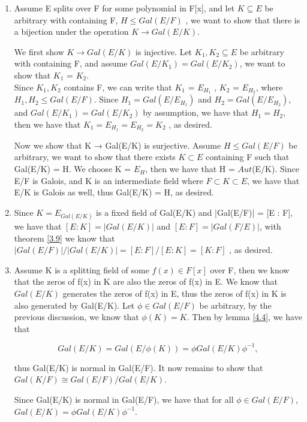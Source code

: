 \documentclass[a4paper, 10pt]{article}
\theoremstyle{plain}
\theoremstyle{definition}
\theoremstyle{remark}
\begin{document}
    \begin{enumerate}
    
  \item Assume E splits over F for some polynomial in F[x], and let $K \subseteq E$ be arbitrary with containing F,  $H \leq Gal(E/F)$ , we want to show that there is a bijection under the operation  $K \longrightarrow Gal(E/K)$.

We first show $K \longrightarrow Gal(E/K)$ is injective. Let $K_1, K_2 \subseteq E$ be arbitrary with containing F, and
assume $Gal(E/K_1) = Gal(E/K_2)$, we want to show that $K_1$ = $K_2$. \\
Since $K_1, K_2$ contains F, we can write that $K_1$ = $E_{H_1}$
, $K_2$ = $E_{H_2}$,   where $H_1, H_2 \leq Gal(E/F)$. 
Since $H_1 = Gal(E/E_{H_1})$ and $H_2 = Gal(E/E_{H_2})$, and $Gal(E/K_1) = Gal(E/K_2)$ by assumption, we have that $H_1 = H_2$, then we
have that $K_1 = E_{H_1} =E_{H_2} = K_2$ , as desired.

Now we show that K → Gal(E/K) is surjective. 
Assume $H \leq Gal(E/F) $ be arbitrary, we want to
show that there exists $K \subset E$ containing F such that Gal(E/K) = H. We choose K = $E_H$, then we have that H = $Aut$(E/K). Since E/F is Galois, and K is an intermediate field where $F \subset K  \subset E$, we have that E/K is Galois as well, thus Gal(E/K) = H, as desired.

    \item  Since $K = E_{Gal(E/K)}$
is a fixed field of Gal(E/K) and |Gal(E/F)| = [E : F], we have that $[E : K] =
|Gal(E/K)|$ and $[E : F] = |Gal(F/E)|$, with  theorem \ref{3.9} we know that  $|Gal(E/F)|/|Gal(E/K)| =
[E : F]/[E : K] = [K : F]$ , as desired.

    \item Assume K is a splitting field of some $f(x) \in F[x]$ over F, then we know that the zeros of f(x) in K
are also the zeros of f(x) in E. We know that $Gal(E/K)$ generates the zeros of f(x) in E, thus the
zeros of f(x) in K is also generated by Gal(E/K). 
Let $ \phi  \in Gal(E/F) $ be arbitrary, by the previous
discussion, we know that $\phi (K) = K$. 
Then by lemma \ref{4.4}, we have that

$$Gal(E/K) = Gal(E/  \phi  (K)) =  \phi  Gal(E/K) \phi ^{-1},$$

thus Gal(E/K) is normal in Gal(E/F). 
It now remains to show that $Gal(K/F) \cong Gal(E/F)/Gal(E/K)$.

Since Gal(E/K) is normal in Gal(E/F), we have that for all $  \phi  \in  Gal(E/F)$, $Gal(E/K) =  \phi  Gal(E/K) \phi ^{-1}$.


\end{enumerate}
\end{document}

